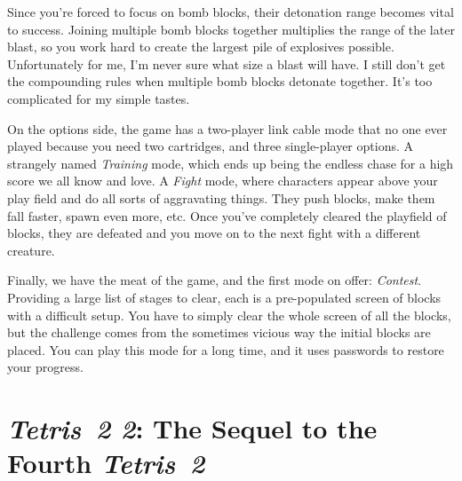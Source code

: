 \documentclass{book}
\let\oldcenter\center
\let\oldendcenter\endcenter
\renewenvironment{center}{\setlength\topsep{0pt}\oldcenter}{\oldendcenter}
\begin{document}
Since you’re forced to focus on bomb blocks, their detonation range becomes vital to success. Joining multiple bomb blocks together multiplies the range of the later blast, so you work hard to create the largest pile of explosives possible. Unfortunately for me, I’m never sure what size a blast will have. I still don’t get the compounding rules when multiple bomb blocks detonate together. It’s too complicated for my simple tastes.

On the options side, the game has a two-player link cable mode that no one ever played because you need two cartridges, and three single-player options. A strangely named \emph{Training} mode, which ends up being the endless chase for a high score we all know and love. A \emph{Fight} mode, where characters appear above your play field and do all sorts of aggravating things. They push blocks, make them fall faster, spawn even more, etc. Once you’ve completely cleared the playfield of blocks, they are defeated and you move on to the next fight with a different creature.

\begin{center}
\quad\vspace{4pt}
\quad\vspace{4pt}
\quad\vspace{4pt}
\quad\vspace{4pt}
\quad\vspace{4pt}
\end{center}

Finally, we have the meat of the game, and the first mode on offer: \emph{Contest}. Providing a large list of stages to clear, each is a pre-populated screen of blocks with a difficult setup. You have to simply clear the whole screen of all the blocks, but the challenge comes from the sometimes vicious way the initial blocks are placed. You can play this mode for a long time, and it uses passwords to restore your progress.

\FloatBarrier\needspace{10mm}\section*{\emph{Tetris~2 2}: The Sequel to the Fourth \emph{Tetris~2}}\nopagebreak[4]
\end{document}
